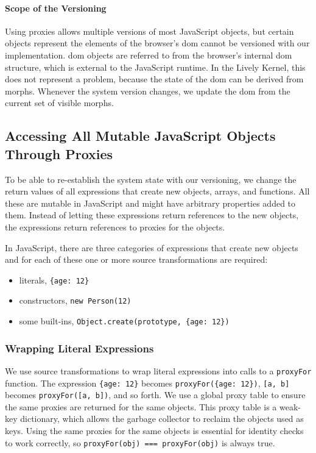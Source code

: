 \paragraph{Scope of the Versioning} \label{subsubsec:IMPLEMENTATION:5.2.1}
Using proxies allows multiple versions of most JavaScript objects, but certain objects represent the elements of the browser's \ac{dom} cannot be versioned with our implementation.
\ac{dom} objects are referred to from the browser's internal \ac{dom} structure, which is external to the JavaScript runtime.
In the Lively Kernel, this does not represent a problem, because the state of the \ac{dom} can be derived from morphs.
Whenever the system version changes, we update the \ac{dom} from the current set of visible morphs.

\subsection{Accessing All Mutable JavaScript Objects Through Proxies}

To be able to re-establish the system state with our versioning, we change the return values of all expressions that create new objects, arrays, and functions.
All these are mutable in JavaScript and might have arbitrary properties added to them.
Instead of letting these expressions return references to the new objects, the expressions return references to proxies for the objects.

In JavaScript, there are three categories of expressions that create new objects and for each of these one or more source transformations are required:
\begin{itemize}
    \item literals, \eg\lstinline|{age: 12}|
    \item constructors, \eg\lstinline|new Person(12)|
    \item some built-ins, \eg\lstinline|Object.create(prototype, {age: 12})|
\end{itemize}

\subsubsection{Wrapping Literal Expressions}

\begin{sloppypar}
We use source transformations to wrap literal expressions into calls to a \lstinline{proxyFor} function.
The expression \lstinline|{age: 12}| becomes \lstinline|proxyFor({age: 12})|, \lstinline{[a, b]} becomes \lstinline{proxyFor([a, b])}, and so forth.
We use a global proxy table to ensure the same proxies are returned for the same objects.
This proxy table is a weak-key dictionary, which allows the garbage collector to reclaim the objects used as keys.
Using the same proxies for the same objects is essential for identity checks to work correctly, so \lstinline{proxyFor(obj) === proxyFor(obj)} is always true.  
\end{sloppypar}

